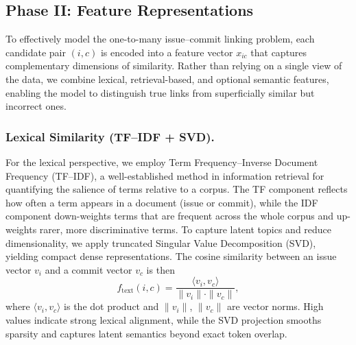 \subsection{Phase II: Feature Representations}


To effectively model the one-to-many issue--commit linking problem, each candidate pair $(i,c)$ is encoded into a feature vector $x_{ic}$ that captures complementary dimensions of similarity. Rather than relying on a single view of the data, we combine lexical, retrieval-based, and optional semantic features, enabling the model to distinguish true links from superficially similar but incorrect ones. 

\subsubsection{Lexical Similarity (TF--IDF + SVD).}
For the lexical perspective, we employ Term Frequency--Inverse Document Frequency (TF--IDF), a well-established method in information retrieval for quantifying the salience of terms relative to a corpus. The TF component reflects how often a term appears in a document (issue or commit), while the IDF component down-weights terms that are frequent across the whole corpus and up-weights rarer, more discriminative terms. To capture latent topics and reduce dimensionality, we apply truncated Singular Value Decomposition (SVD), yielding compact dense representations. The cosine similarity between an issue vector $v_i$ and a commit vector $v_c$ is then
\[
f_{\text{text}}(i,c) = \frac{\langle v_i, v_c \rangle}{\|v_i\|\cdot \|v_c\|},
\]
where $\langle v_i, v_c \rangle$ is the dot product and $\|v_i\|$, $\|v_c\|$ are vector norms. High values indicate strong lexical alignment, while the SVD projection smooths sparsity and captures latent semantics beyond exact token overlap.

